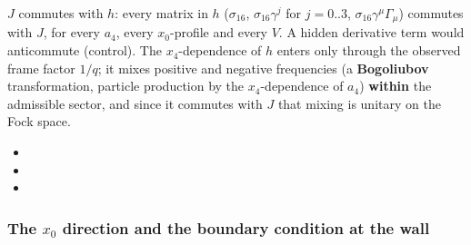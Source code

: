 $J$ commutes with $h$: every matrix in $h$ ($\sigma_{16}$, $\sigma_{16}\gamma^j$ for $j=0..3$,
$\sigma_{16}\gamma^\mu\Gamma_\mu$) commutes with $J$, for every $a_4$, every $x_0$-profile and every
$V$. A hidden derivative term would anticommute (control). The $x_4$-dependence of $h$ enters only
through the observed frame factor $1/q$; it mixes positive and negative frequencies (a
\textbf{Bogoliubov} transformation, particle production by the $x_4$-dependence of $a_4$)
\textbf{within} the admissible sector, and since it commutes with $J$ that mixing is unitary on the
Fock space. 
\begin{itemize}
  \item {}
  \item {}
  \item {}
\end{itemize}

\subsubsection{The \texorpdfstring{$x_0$}{x0} direction and the boundary condition at the wall}
\label{sec:3.5.12}

